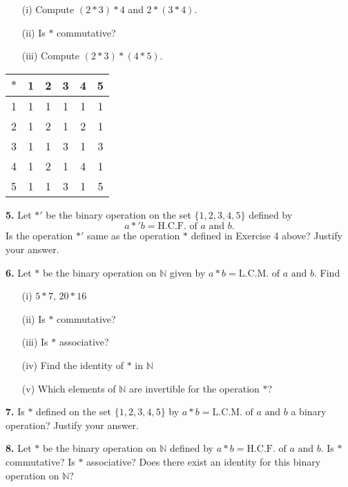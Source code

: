 \documentclass[a4paper,12pt]{article}
\begin{document}
\begin{enumerate}
    \item[(i)] Compute $(2 * 3) * 4$ and $2 * (3 * 4)$.
    \item[(ii)] Is $*$ commutative?
    \item[(iii)] Compute $(2 * 3) * (4 * 5)$.
\end{enumerate}


\begin{table}[h]
\centering
\begin{tabular}{|c|c|c|c|c|c|}
    \hline
    $*$ & 1 & 2 & 3 & 4 & 5 \\
    \hline
    1 & 1 & 1 & 1 & 1 & 1 \\
    2 & 1 & 2 & 1 & 2 & 1 \\
    3 & 1 & 1 & 3 & 1 & 3 \\
    4 & 1 & 2 & 1 & 4 & 1 \\
    5 & 1 & 1 & 3 & 1 & 5 \\
    \hline
\end{tabular}
\end{table}



\textbf{5.} Let $*'$ be the binary operation on the set $\{1,2,3,4,5\}$ defined by 
\[
a *' b = \text{H.C.F. of } a \text{ and } b.
\]
Is the operation $*'$ same as the operation $*$ defined in Exercise 4 above? Justify your answer.

\textbf{6.} Let $*$ be the binary operation on $\mathbb{N}$ given by $a * b = \text{L.C.M. of } a \text{ and } b.$ Find

\begin{enumerate}
    \item[(i)] $5 * 7$, $20 * 16$
    \item[(ii)] Is $*$ commutative?
    \item[(iii)] Is $*$ associative?
    \item[(iv)] Find the identity of $*$ in $\mathbb{N}$
    \item[(v)] Which elements of $\mathbb{N}$ are invertible for the operation $*$?
\end{enumerate}

\textbf{7.} Is $*$ defined on the set $\{1,2,3,4,5\}$ by $a * b = \text{L.C.M. of } a \text{ and } b$ a binary operation? Justify your answer.

\textbf{8.} Let $*$ be the binary operation on $\mathbb{N}$ defined by $a * b = \text{H.C.F. of } a \text{ and } b$. 
Is $*$ commutative? Is $*$ associative? Does there exist an identity for this binary operation on $\mathbb{N}$?
\end{document}
